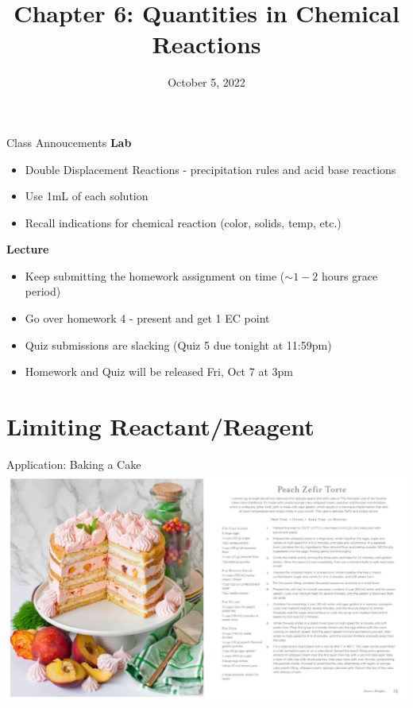 \documentclass[11pt]{beamer}
\title{Chapter 6: Quantities in Chemical Reactions}
\institute{Chemistry Department, Cypress College}
\date{October 5, 2022}
\begin{document}
\begin{frame}
  \titlepage
\end{frame}

\begin{frame}{Class Annoucements}
  \textbf{Lab}
  \begin{itemize}
  \item Double Displacement Reactions - precipitation rules
    and acid base reactions
  \item Use 1mL of each solution
  \item Recall indications for chemical reaction (color, solids,
    temp, etc.)
  \end{itemize}
  
  \textbf{Lecture}
  \begin{itemize}
  \item Keep submitting the homework assignment on time
    ($\sim 1-2$ hours grace period)
  \item Go over homework 4 - present and get 1 EC point
  \item Quiz submissions are slacking (Quiz 5 due tonight
    at 11:59pm)
  \item Homework and Quiz will be released Fri, Oct 7 at 3pm
  \end{itemize}
\end{frame}

\section{Limiting Reactant/Reagent}

\begin{frame}{Application: Baking a Cake}
  \centering
  \includegraphics[width=\linewidth]{peach_cake}
\end{frame}
\end{document}
